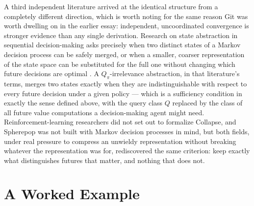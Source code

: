 \documentclass[11pt]{article}
\begin{document}
A third independent literature arrived at the identical structure from a completely different direction, which is worth noting for the same reason Git was worth dwelling on in the earlier essay: independent, uncoordinated convergence is stronger evidence than any single derivation. Research on state abstraction in sequential decision-making asks precisely when two distinct states of a Markov decision process can be safely merged, or when a smaller, coarser representation of the state space can be substituted for the full one without changing which future decisions are optimal \cite{li2006}. A $Q_\pi$-irrelevance abstraction, in that literature's terms, merges two states exactly when they are indistinguishable with respect to every future decision under a given policy --- which is a sufficiency condition in exactly the sense defined above, with the query class $Q$ replaced by the class of all future value computations a decision-making agent might need. Reinforcement-learning researchers did not set out to formalize Collapse, and Spherepop was not built with Markov decision processes in mind, but both fields, under real pressure to compress an unwieldy representation without breaking whatever the representation was for, rediscovered the same criterion: keep exactly what distinguishes futures that matter, and nothing that does not.

\section{A Worked Example}
\end{document}
